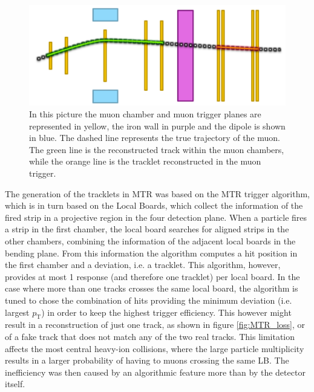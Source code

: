 \begin{figure}[!ht]
\begin{center}
\includegraphics[width=0.9\linewidth]{Chapters/O2/Figs/MTR_logic.pdf}
\caption{In this picture the muon chamber and muon trigger planes are represented in yellow, the iron wall in purple and the dipole is shown in blue. The dashed line represents the true trajectory of the muon. The green line is the reconstructed track within the muon chambers, while the orange line is the tracklet reconstructed in the muon trigger.}
\label{fig:MTR_old}
\end{center}
\end{figure}

The generation of the tracklets in MTR was based on the MTR trigger algorithm, which is in turn based on the Local Boards, which collect the information of the fired strip in a projective region in the four detection plane. 
When a particle fires a strip in the first chamber, the local board searches for aligned strips in the other chambers, combining the information of the adjacent  local boards in the bending plane. From this information the algorithm computes a hit position in the first chamber and a deviation, i.e. a tracklet.
This algorithm, however, provides at most 1 response (and therefore one tracklet) per local board. In the case where more than one tracks crosses the same local board, the algorithm is tuned to chose the combination of hits providing the minimum deviation (i.e. largest $p_\mathrm{T}$) in order to keep the highest trigger efficiency. 
This however might result in a reconstruction of just one track, as shown in figure \ref{fig:MTR_loss}, or of a fake track that does not match any of the two real tracks.
This limitation affects the most central heavy-ion collisions, where the large particle multiplicity results in a larger probability of having to muons crossing the same LB.
The inefficiency was then caused by an algorithmic feature more than by the detector itself.


